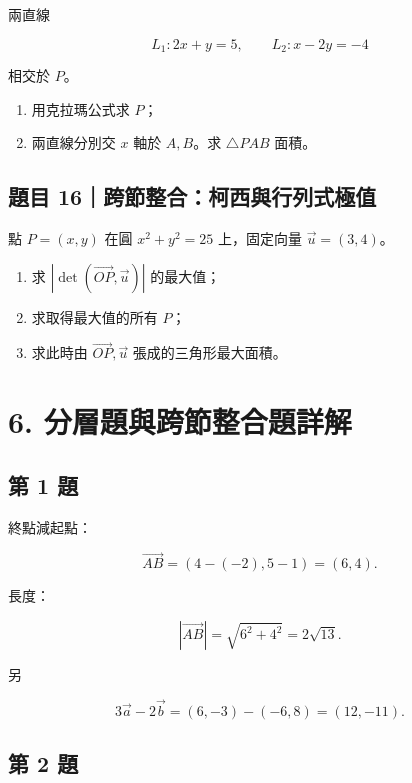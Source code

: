 \documentclass[11pt,a4paper]{article}
\providecommand{\tightlist}{%
  \setlength{\itemsep}{0pt}\setlength{\parskip}{0pt}}
\begin{document}
兩直線

\[
L_1:2x+y=5,
\qquad
L_2:x-2y=-4
\]

相交於 \(P\)。

\begin{enumerate}
\def\labelenumi{\arabic{enumi}.}
\tightlist
\item
  用克拉瑪公式求 \(P\)；
\item
  兩直線分別交 \(x\) 軸於 \(A,B\)。求 \(\triangle PAB\) 面積。
\end{enumerate}

\subsection{題目 16｜跨節整合：柯西與行列式極值}\label{ux984cux76ee-16ux8de8ux7bc0ux6574ux5408ux67efux897fux8207ux884cux5217ux5f0fux6975ux503c}

點 \(P=(x,y)\) 在圓 \(x^2+y^2=25\) 上，固定向量 \(\vec u=(3,4)\)。

\begin{enumerate}
\def\labelenumi{\arabic{enumi}.}
\tightlist
\item
  求 \(|\det(\overrightarrow{OP},\vec u)|\) 的最大值；
\item
  求取得最大值的所有 \(P\)；
\item
  求此時由 \(\overrightarrow{OP},\vec u\) 張成的三角形最大面積。
\end{enumerate}

\clearpage

\section{6. 分層題與跨節整合題詳解}\label{ux5206ux5c64ux984cux8207ux8de8ux7bc0ux6574ux5408ux984cux8a73ux89e3}

\subsection{第 1 題}\label{ux7b2c-1-ux984c}

終點減起點：

\[
\overrightarrow{AB}
=(4-(-2),5-1)
=\boxed{(6,4)}.
\]

長度：

\[
|\overrightarrow{AB}|
=\sqrt{6^2+4^2}
=\boxed{2\sqrt{13}}.
\]

另

\[
3\vec a-2\vec b
=(6,-3)-(-6,8)
=\boxed{(12,-11)}.
\]

\subsection{第 2 題}\label{ux7b2c-2-ux984c}
\end{document}
